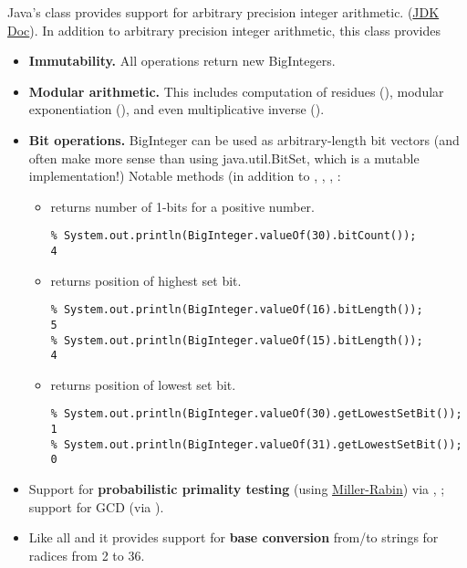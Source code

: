 Java's  class provides support for arbitrary precision integer arithmetic.
(\href{http://docs.oracle.com/javase/6/docs/api/java/math/BigInteger.html}{JDK Doc}).
In addition to arbitrary precision integer arithmetic, this class provides

\begin{itemize}
    \item \textbf{Immutability.}  All operations return new BigIntegers.

    \item \textbf{Modular arithmetic.}  
        This includes computation of residues (), modular exponentiation (),
        and even multiplicative inverse ().

    \item \textbf{Bit operations.}  BigInteger can be used as arbitrary-length bit vectors (and often make more sense
        than using java.util.BitSet, which is a mutable implementation!)
        Notable methods (in addition to , , , :
    \begin{itemize}
    \item {} returns number of 1-bits for a positive number.
\begin{verbatim}
% System.out.println(BigInteger.valueOf(30).bitCount());
4
\end{verbatim}
    \item {} returns position of highest set bit.
\begin{verbatim}
% System.out.println(BigInteger.valueOf(16).bitLength());
5
% System.out.println(BigInteger.valueOf(15).bitLength());
4
\end{verbatim}
    \item {} returns position of lowest set bit.
\begin{verbatim}
% System.out.println(BigInteger.valueOf(30).getLowestSetBit());
1
% System.out.println(BigInteger.valueOf(31).getLowestSetBit());
0
\end{verbatim}
    \end{itemize}
        \item Support for \textbf{probabilistic primality testing}
            (using \href{http://en.wikipedia.org/wiki/Miller–Rabin_primality_test}{Miller-Rabin})
        via , ; support for GCD (via ).
    \item Like all  and  it provides support for
        \textbf{base conversion} from/to strings for radices from 2 to 36.
\end{itemize}


